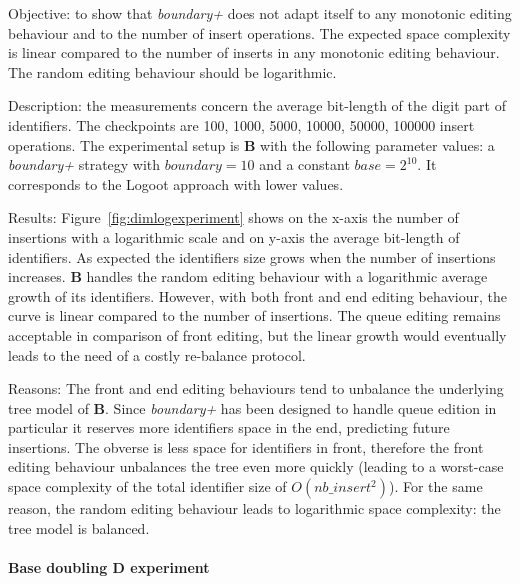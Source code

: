 \begin{asparadesc}
\item[Objective:] to show that \emph{boundary+} does not adapt itself to any
  monotonic editing behaviour and to the number of insert operations. The
  expected space complexity is linear compared to the number of inserts in any
  monotonic editing behaviour. The random editing behaviour should be
  logarithmic.

\item[Description:] the measurements concern the average bit-length of the
  digit part of identifiers. The checkpoints are 100, 1000, 5000, 10000, 50000,
  100000 insert operations. The experimental setup is \textbf{B} with the
  following parameter values: a \emph{boundary+} strategy with $boundary=10$
  and a constant $base=2^{10}$. It corresponds to the Logoot approach with
  lower values.

\item[Results:] Figure~\ref{fig:dimlogexperiment} shows on the x-axis
  the number of insertions with a logarithmic scale and on y-axis the
  average bit-length of identifiers. As expected the identifiers size
  grows when the number of insertions increases. \textbf{B} handles
  the random editing behaviour with a logarithmic average growth of
  its identifiers. However, with both front and end editing
  behaviour, the curve is linear compared to the number of insertions.
  The queue editing remains acceptable in comparison of front editing,
  but the linear growth would eventually leads to the need of a costly
  re-balance protocol.

\item[Reasons:] The front and end editing behaviours tend to unbalance the
  underlying tree model of \textbf{B}. Since \emph{boundary+} has been designed
  to handle queue edition in particular it reserves more identifiers space in
  the end, predicting future insertions. The obverse is less space for
  identifiers in front, therefore the front editing behaviour unbalances the
  tree even more quickly (leading to a worst-case space complexity of the total
  identifier size of $O(nb\_insert^2)$). For the same reason, the
  random editing behaviour leads to logarithmic space complexity: the tree
  model is balanced.
\end{asparadesc}

\paragraph{Base doubling \textbf{D} experiment}

